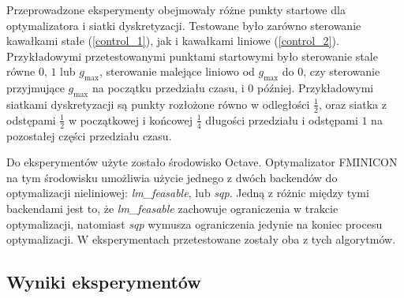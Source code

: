 \documentclass[11pt]{article}
\begin{document}
Przeprowadzone eksperymenty obejmowały różne punkty startowe dla optymalizatora i siatki dyskretyzacji. Testowane było zarówno sterowanie kawałkami stałe (\ref{control_1}), jak i kawałkami liniowe (\ref{control_2}). Przykładowymi przetestowanymi punktami startowymi było sterowanie stale równe $0$, $1$ lub $g_{\max}$, sterowanie malejące liniowo od $g_{\max}$ do $0$, czy sterowanie przyjmujące $g_{\max}$ na początku przedziału czasu, i $0$ później. Przykładowymi siatkami dyskretyzacji są punkty rozłożone równo w odległości $\frac{1}{2}$, oraz siatka z odstępami $\frac{1}{2}$ w początkowej i końcowej $\frac{1}{4}$ długości przedziału i odstępami $1$ na pozostałej części przedziału czasu.

Do eksperymentów użyte zostało środowisko Octave. Optymalizator FMINICON na tym środowisku umożliwia użycie jednego z dwóch backendów do optymalizacji nieliniowej: {\it lm\_feasable}, lub {\it sqp}. Jedną z różnic między tymi backendami jest to, że {\it lm\_feasable\/} zachowuje ograniczenia w trakcie optymalizacji, natomiast {\it sqp\/} wymusza ograniczenia jedynie na koniec procesu optymalizacji. W eksperymentach przetestowane zostały oba z tych algorytmów.

\subsection{Wyniki eksperymentów}
\end{document}
